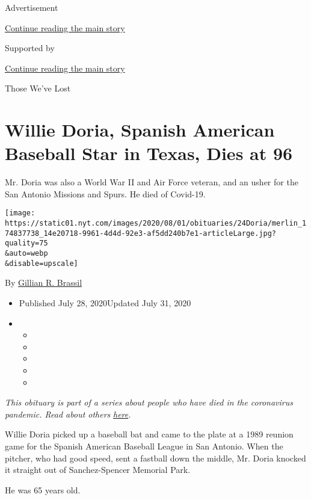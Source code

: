 Advertisement

\protect\hyperlink{after-top}{Continue reading the main story}

Supported by

\protect\hyperlink{after-sponsor}{Continue reading the main story}

Those We've Lost

\hypertarget{willie-doria-spanish-american-baseball-star-in-texas-dies-at-96}{%
\section{Willie Doria, Spanish American Baseball Star in Texas, Dies at
96}\label{willie-doria-spanish-american-baseball-star-in-texas-dies-at-96}}

Mr. Doria was also a World War II and Air Force veteran, and an usher
for the San Antonio Missions and Spurs. He died of Covid-19.

\texttt{[image: https://static01.nyt.com/images/2020/08/01/obituaries/24Doria/merlin\_174837738\_14e20718-9961-4d4d-92e3-af5dd240b7e1-articleLarge.jpg?quality=75\\\&auto=webp\\\&disable=upscale]}

By \href{https://www.nytimes.com/by/gillian-r--brassil}{Gillian R.
Brassil}

\begin{itemize}
\item
  Published July 28, 2020Updated July 31, 2020
\item
  \begin{itemize}
  \item
  \item
  \item
  \item
  \item
  \end{itemize}
\end{itemize}

\emph{This obituary is part of a series about people who have died in
the coronavirus pandemic. Read about others}
\href{https://www.nytimes.com/interactive/2020/obituaries/people-died-coronavirus-obituaries.html}{\emph{here}}\emph{.}

Willie Doria picked up a baseball bat and came to the plate at a 1989
reunion game for the Spanish American Baseball League in San Antonio.
When the pitcher, who had good speed, sent a fastball down the middle,
Mr. Doria knocked it straight out of Sanchez-Spencer Memorial Park.

He was 65 years old.

